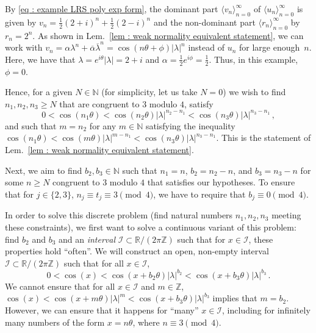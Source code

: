 \documentclass[a4paper,UKenglish,cleveref, autoref, thm-restate]{lipics-v2021}
\newcommand{\nat} {\mathbb{N}}
\begin{document}
By \eqref{eq : example LRS poly exp form}, the dominant part $\langle v_n\rangle_{n=0}^\infty$ of $\langle u_n\rangle_{n=0}^\infty$ is given by $v_n = \frac{1}{2}(2+i)^n + \frac{1}{2}(2-i)^n$ and the non-dominant part $\langle r_n\rangle_{n=0}^\infty$ by $r_n = 2^n$.
As shown in Lem.~\ref{lem : weak normality equivalent statement}, we can work with $v_n = \alpha \lambda^n + \overline{\alpha} \overline{\lambda}^n = \cos(n\theta + \phi)|\lambda|^n$ instead of $u_n$ for large enough~$n$.  
Here, we have that $\lambda = e^{i\theta}|\lambda| = 2+i$ and $\alpha = \frac{1}{2}e^{i\phi} = \frac{1}{2}$.
Thus, in this example, $\phi = 0$.

Hence, for a given $N \in \nat$ (for simplicity, let us take $N = 0$) we wish to find $n_1,n_2,n_3 \ge N$ that are congruent to $3$ modulo $4$, satisfy
\begin{equation*}%
  0 < \cos(n_1\theta) < \cos(n_2\theta )|\lambda|^{n_2-n_1} <
  \cos(n_3\theta)|\lambda|^{n_3-n_1} \, ,
\end{equation*}
and such that $m = n_2$ for any $m \in \nat$ satisfying the inequality $\cos(n_1\theta) < \cos(m\theta)|\lambda|^{m-n_1} < \cos(n_3 \theta)|\lambda|^{n_3-n_1}$.
This is the statement of Lem.~\ref{lem : weak normality equivalent statement}.  

Next, we aim to find $b_2, b_3 \in \nat$ such that $n_1 = n$, $b_2 = n_2 - n$, and $b_3 = n_3 - n$ for some $n \ge N$ congruent to $3$ modulo $4$ that satisfies our hypotheses.
To ensure that for $j \in \{2,3\}$, $n_j \equiv t_j \equiv 3 \pmod{4}$, we have to require that $b_j \equiv 0 \pmod{4}$. 

In order to solve this discrete problem (find natural numbers $n_1,n_2,n_3$ meeting these constraints), we first want to solve a continuous variant of this problem: find $b_2$ and $b_3$ and an \emph{interval} $\mathcal{I} \subset \mathbb{R}/(2\pi\mathbb{Z})$ such that for $x \in\mathcal{I}$, these properties hold ``often''.  
We will construct an open, non-empty interval $\mathcal{I} \subset \mathbb{R}/(2\pi\mathbb{Z})$ such that for all $x \in \mathcal{I}$,
\begin{equation}\label{eq : inequalilty x example}
    0 < \cos(x) < \cos(x + b_2\theta)|\lambda|^{b_2} < \cos(x + b_3\theta)|\lambda|^{b_3}\,.
\end{equation}
We cannot ensure that for all $x \in \mathcal{I}$ and $m \in \mathbb{Z}$, $\cos(x) < \cos(x + m\theta)|\lambda|^m < \cos(x + b_3\theta)|\lambda|^{b_3}$ implies that $m = b_2$. 
However, we can ensure that it happens for ``many'' $x \in \mathcal{I}$, including for infinitely many numbers of the form $x = n\theta$, where $n \equiv 3 \pmod 4$.
\end{document}
